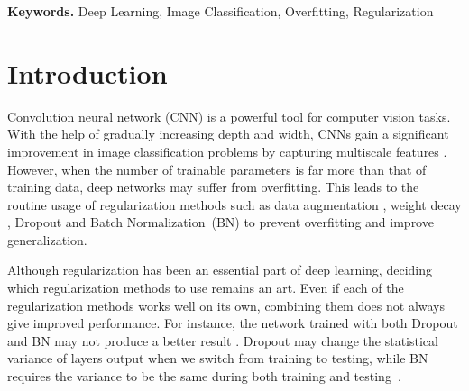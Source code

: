 \documentclass[11pt]{article}
\begin{document}
{\bf Keywords.} Deep Learning, Image Classification, Overfitting, Regularization

\section{Introduction}
Convolution neural network (CNN) is a powerful tool for computer vision tasks. With the help of gradually increasing depth and width, CNNs \cite{resnet, preresnet, densenet, wrn, resnext} gain a significant improvement in image classification problems by capturing multiscale features \cite{visual}. However, when the number of trainable parameters is far more than that of training data, deep networks may suffer from overfitting. This leads to the routine usage of regularization methods such as data augmentation \cite{autoaugment}, weight decay \cite{cifar}, Dropout \cite{dropout} and Batch Normalization~(BN) \cite{bn} to prevent overfitting and improve generalization.

Although regularization has been an essential part of deep learning, deciding which regularization methods to use remains an art. Even if each of the regularization methods works well on its own, combining them does not always give improved performance. For instance, the network trained with both Dropout and BN may not produce a better result \cite{bn, BNandDropout}. Dropout may change the statistical variance of layers output when we switch from training to testing, while BN requires the variance to be the same during both training and testing~\cite{BNandDropout}.
\end{document}

